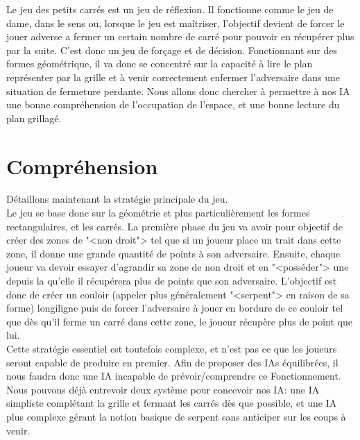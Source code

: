 \documentclass[a4paper,12pt]{report}
\begin{document}
Le jeu des petits carr\'es est un jeu de r\'eflexion. Il fonctionne comme le jeu de dame, dans le sens ou, lorsque le jeu est ma\^itriser, l'objectif devient de forcer le jouer adverse a fermer un certain nombre de carr\'e pour pouvoir en r\'ecup\'erer plus par la suite. C'est donc un jeu de for\c{c}age et de d\'ecision. Fonctionnant sur des formes g\'eom\'etrique, il va donc se concentr\'e sur la capacit\'e \`a lire le plan repr\'esenter par la grille et \`a venir correctement enfermer l'adversaire dans une situation de fermeture perdante. Nous allons donc chercher \`a permettre \`a nos IA une bonne compr\'ehension de l'occupation de l'espace, et une bonne lecture du plan grillag\'e.

\section{Compr\'ehension}

D\'etaillons maintenant la strat\'egie principale du jeu.\\
Le jeu se base donc sur la g\'eom\'etrie et plus particuli\`erement les formes rectangulaires, et les carr\'es. La premi\`ere phase du jeu va avoir pour objectif de cr\'eer des zones de "<non droit"> tel que si un joueur place un trait dans cette zone, il donne une grande quantit\'e de points \`a son adversaire. Ensuite, chaque joueur va devoir essayer d'agrandir sa zone de non droit et en "<poss\'eder"> une depuis la qu'elle il r\'ecup\'erera plus de points que son adversaire. L'objectif est donc de cr\'eer un couloir (appeler plus g\'en\'eralement "<serpent"> en raison de sa forme) longiligne puis de forcer l'adversaire \`a jouer en bordure de ce couloir tel que d\`es qu'il ferme un carr\'e dans cette zone, le joueur r\'ecup\`ere plus de point que lui. \\
Cette strat\'egie essentiel est toutefois complexe, et n'est pas ce que les joueurs seront capable de produire en premier. Afin de proposer des IAs \'equilibr\'ees,  il nous faudra donc une IA incapable de pr\'evoir/comprendre ce Fonctionnement. \\
Nous pouvons d\'ej\`a entrevoir deux syst\`eme pour concevoir nos IA: une IA simpliste compl\'etant la grille et fermant les carr\'es d\`es que possible, et une IA plus complexe g\'erant la notion basique de serpent sans anticiper sur les coups \`a venir.
\end{document}
